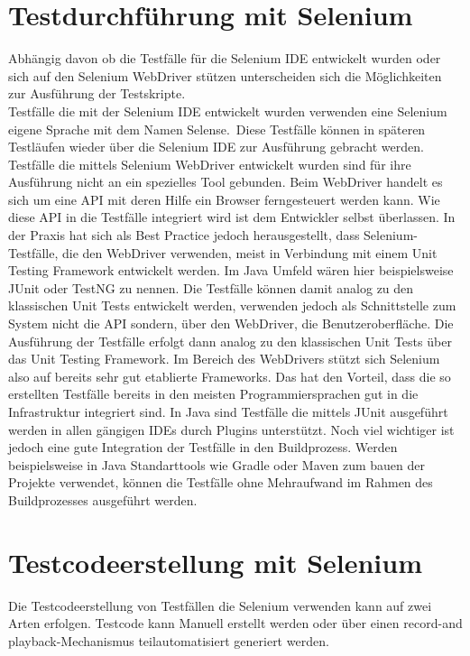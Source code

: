 \section{Testdurchführung mit Selenium}
\label{sec:testdurchführung_mit_selenium}
Abhängig davon ob die Testfälle für die Selenium IDE entwickelt wurden oder sich auf den Selenium WebDriver stützen unterscheiden sich die Möglichkeiten zur Ausführung der Testskripte.\\
Testfälle die mit der Selenium IDE entwickelt wurden verwenden eine Selenium eigene Sprache mit dem Namen \grq Selense\grq.\ Diese Testfälle können in späteren Testläufen wieder über die Selenium IDE zur Ausführung gebracht werden. \\
Testfälle die mittels Selenium WebDriver entwickelt wurden sind für ihre Ausführung nicht an ein spezielles Tool gebunden. Beim WebDriver handelt es sich um eine API mit deren Hilfe ein Browser ferngesteuert werden kann. Wie diese API in die Testfälle integriert wird ist dem Entwickler selbst überlassen. In der Praxis hat sich als Best Practice jedoch herausgestellt, dass Selenium-Testfälle, die den WebDriver verwenden, meist in Verbindung mit einem Unit Testing Framework entwickelt werden.
Im Java Umfeld wären hier beispielsweise JUnit oder TestNG zu nennen.
Die Testfälle können damit analog zu den klassischen Unit Tests entwickelt werden, verwenden jedoch als Schnittstelle zum System nicht die API sondern, über den WebDriver, die Benutzeroberfläche. 
Die Ausführung der Testfälle erfolgt dann analog zu den klassischen Unit Tests über das Unit Testing Framework.
Im Bereich des WebDrivers stützt sich Selenium also auf bereits sehr gut etablierte Frameworks. Das hat den Vorteil, dass die so erstellten Testfälle bereits in den meisten Programmiersprachen gut in die Infrastruktur integriert sind. In Java sind Testfälle die mittels JUnit ausgeführt werden in allen gängigen IDEs durch Plugins unterstützt. Noch viel wichtiger ist jedoch eine gute Integration der Testfälle in den Buildprozess. Werden beispielsweise in Java Standarttools wie Gradle oder Maven zum bauen der Projekte verwendet, können die Testfälle ohne Mehraufwand im Rahmen des Buildprozesses ausgeführt werden.



\section{Testcodeerstellung mit Selenium}
\label{sec:Testdesign}
Die Testcodeerstellung von Testfällen die Selenium verwenden kann auf zwei Arten erfolgen.
Testcode kann Manuell erstellt werden oder über einen \grq record-and playback\grq -Mechanismus teilautomatisiert generiert werden.

